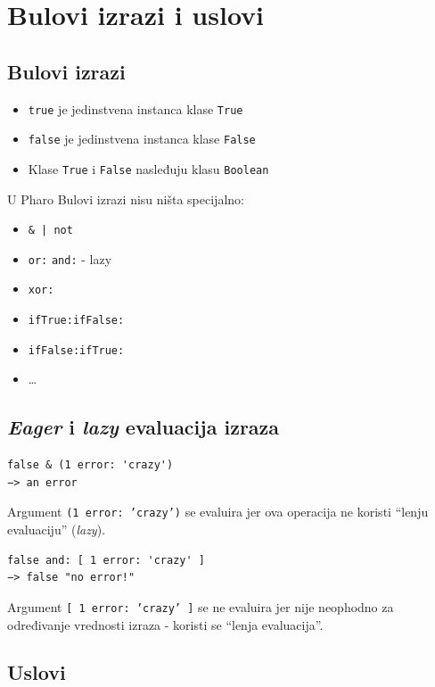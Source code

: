 \documentclass[presentation]{beamer}
\begin{document}
\section{Bulovi izrazi i uslovi}
\label{sec:orgc00164e}
\subsection{Bulovi izrazi}
\label{sec:orgb8532d6}

\begin{itemize}
\item \texttt{true} je jedinstvena instanca klase \texttt{True}
\item \texttt{false} je jedinstvena instanca klase \texttt{False}
\item Klase \texttt{True} i \texttt{False} nasleđuju klasu \texttt{Boolean}
\end{itemize}

U Pharo Bulovi izrazi nisu ništa specijalno:
\begin{itemize}
\item \texttt{\& | not}
\item \texttt{or:} \texttt{and:} - lazy
\item \texttt{xor:}
\item \texttt{ifTrue:ifFalse:}
\item \texttt{ifFalse:ifTrue:}
\item \ldots{}
\end{itemize}

\subsection{\emph{Eager} i \emph{lazy} evaluacija izraza}
\label{sec:orgcf5a5be}

\begin{verbatim}
false & (1 error: 'crazy')
−> an error
\end{verbatim}

Argument \texttt{(1 error: 'crazy')} se evaluira jer ova operacija ne koristi ``lenju
evaluaciju'' (\emph{lazy}).

\begin{verbatim}
false and: [ 1 error: 'crazy' ]
−> false "no error!"
\end{verbatim}

Argument \texttt{[ 1 error: 'crazy' ]} se ne evaluira jer nije neophodno za određivanje
vrednosti izraza - koristi se ``lenja evaluacija''.

\subsection{Uslovi}
\label{sec:org94e1f61}
\end{document}
